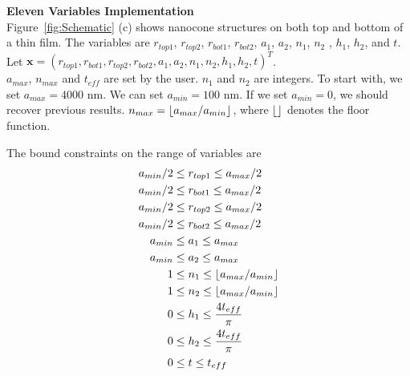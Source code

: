 \documentclass[12pt]{article}
\numberwithin{equation}{section}
\DeclarePairedDelimiter\floor{\lfloor}{\rfloor}
\numberwithin{equation}{section}
\begin{document}
\begin{outline}[enumerate]
\1 \textbf{Eleven Variables Implementation} \\
Figure~\ref{fig:Schematic} (c) shows nanocone structures on both top and bottom of a thin film.  
The variables are $r_{top1}$, $r_{top2}$, $r_{bot1}$, $r_{bot2}$, $a_1$, $a_2$, $n_1$, $n_2$ , $h_1$, $h_2$, and $t$. \\
Let $\mathbf{x} = \left ( r_{top1}, r_{bot1}, r_{top2}, r_{bot2}, a_1, a_2, n_1, n_2, h_1, h_2, t  \right )^T $. \\
$a_{max}$, $n_{max}$ and $t_{eff}$ are set by the user.  $n_{1}$ and $n_{2}$ are integers. To start with, we set $a_{max} = 4000$ nm.
We can set $a_{min} = 100$ nm.  If we set $a_{min} = 0$, we should recover previous results.
$n_{max} = \floor{a_{max}/a_{min}}$, where $\floor{ }$ denotes the floor function.

The bound constraints on the range of variables are
\begin{align*}
a_{min}/2 & \leq r_{top1} \leq a_{max}/2 \\
a_{min}/2 & \leq r_{bot1} \leq a_{max}/2 \\
a_{min}/2 & \leq r_{top2} \leq a_{max}/2 \\
a_{min}/2 & \leq r_{bot2} \leq a_{max}/2 \\
a_{min} & \leq a_{1} \leq a_{max} \\
a_{min} & \leq a_{2} \leq a_{max} \\
1 & \leq n_1 \leq  \floor{a_{max}/a_{min}} \\
1 & \leq n_2 \leq  \floor{a_{max}/a_{min}} \\
0 & \leq h_1 \leq \frac{4 t_{eff}}{\pi}  \\
0 & \leq h_2 \leq \frac{4 t_{eff}}{\pi}  \\
0 & \leq t \leq t_{eff}
\end{align*}


\end{outline}
\end{document}
